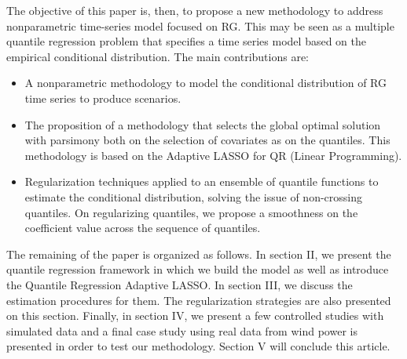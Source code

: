  
The objective of this paper is, then, to propose a new methodology to address nonparametric time-series model focused on RG. This may be seen as a multiple quantile regression problem that specifies a time series model based on the empirical conditional distribution. The main contributions are:
\begin{itemize}
	\item A nonparametric methodology to model the conditional distribution of RG time series to produce scenarios.
	
	\item The proposition of a methodology that selects the global optimal solution with parsimony both on the selection of covariates as on the quantiles. This methodology is based on the Adaptive LASSO for QR (Linear Programming).
	
	\item Regularization techniques applied to an ensemble of quantile functions to estimate the conditional distribution, solving the issue of non-crossing quantiles. On regularizing quantiles, we propose a smoothness on the coefficient value across the sequence of quantiles.	
	
\end{itemize}





The remaining of the paper is organized as follows. In section II, we present the quantile regression framework in which we build the model as well as introduce the Quantile Regression Adaptive LASSO. In section III, we discuss the estimation procedures for them. The regularization strategies are also presented on this section. Finally, in section IV, we present a few controlled studies with simulated data and a final case study using real data from wind power is presented in order to test our methodology. Section V will conclude this article.
